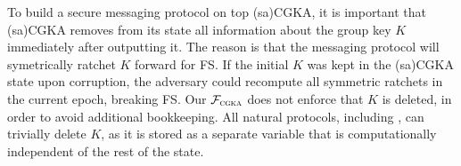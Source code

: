 \begin{description}[itemsep=0pt]
	
%	
%	
	
	\item [Deleting group keys] To build a secure messaging protocol on top (sa)CGKA, it is important that (sa)CGKA removes from its state all information about the group key $K$ immediately after outputting it. The reason is that the messaging protocol will symetrically ratchet $K$ forward for FS. If the initial $K$ was kept in the (sa)CGKA state upon corruption, the adversary could recompute all symmetric ratchets in the current epoch, breaking FS.
	Our $\mathcal{F}_{\normalfont\textsc{cgka}}$ does not enforce that $K$ is deleted, in order to avoid additional bookkeeping. All natural protocols, including \saik, can trivially delete $K$, as it is stored as a separate variable that is computationally independent of the rest of the state.
	
	

\end{description}
